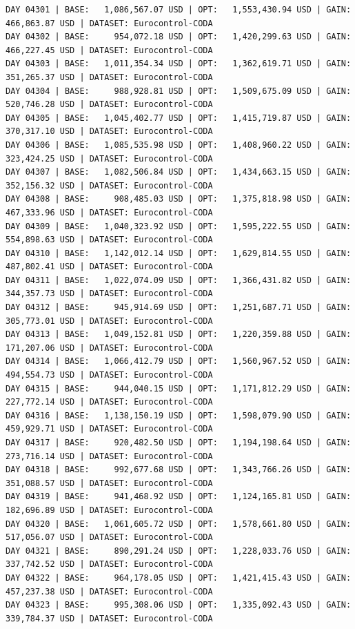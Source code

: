 \documentclass[11pt,a4paper]{article}
\begin{document}
\begin{verbatim}
DAY 04301 | BASE:   1,086,567.07 USD | OPT:   1,553,430.94 USD | GAIN: 466,863.87 USD | DATASET: Eurocontrol-CODA
DAY 04302 | BASE:     954,072.18 USD | OPT:   1,420,299.63 USD | GAIN: 466,227.45 USD | DATASET: Eurocontrol-CODA
DAY 04303 | BASE:   1,011,354.34 USD | OPT:   1,362,619.71 USD | GAIN: 351,265.37 USD | DATASET: Eurocontrol-CODA
DAY 04304 | BASE:     988,928.81 USD | OPT:   1,509,675.09 USD | GAIN: 520,746.28 USD | DATASET: Eurocontrol-CODA
DAY 04305 | BASE:   1,045,402.77 USD | OPT:   1,415,719.87 USD | GAIN: 370,317.10 USD | DATASET: Eurocontrol-CODA
DAY 04306 | BASE:   1,085,535.98 USD | OPT:   1,408,960.22 USD | GAIN: 323,424.25 USD | DATASET: Eurocontrol-CODA
DAY 04307 | BASE:   1,082,506.84 USD | OPT:   1,434,663.15 USD | GAIN: 352,156.32 USD | DATASET: Eurocontrol-CODA
DAY 04308 | BASE:     908,485.03 USD | OPT:   1,375,818.98 USD | GAIN: 467,333.96 USD | DATASET: Eurocontrol-CODA
DAY 04309 | BASE:   1,040,323.92 USD | OPT:   1,595,222.55 USD | GAIN: 554,898.63 USD | DATASET: Eurocontrol-CODA
DAY 04310 | BASE:   1,142,012.14 USD | OPT:   1,629,814.55 USD | GAIN: 487,802.41 USD | DATASET: Eurocontrol-CODA
DAY 04311 | BASE:   1,022,074.09 USD | OPT:   1,366,431.82 USD | GAIN: 344,357.73 USD | DATASET: Eurocontrol-CODA
DAY 04312 | BASE:     945,914.69 USD | OPT:   1,251,687.71 USD | GAIN: 305,773.01 USD | DATASET: Eurocontrol-CODA
DAY 04313 | BASE:   1,049,152.81 USD | OPT:   1,220,359.88 USD | GAIN: 171,207.06 USD | DATASET: Eurocontrol-CODA
DAY 04314 | BASE:   1,066,412.79 USD | OPT:   1,560,967.52 USD | GAIN: 494,554.73 USD | DATASET: Eurocontrol-CODA
DAY 04315 | BASE:     944,040.15 USD | OPT:   1,171,812.29 USD | GAIN: 227,772.14 USD | DATASET: Eurocontrol-CODA
DAY 04316 | BASE:   1,138,150.19 USD | OPT:   1,598,079.90 USD | GAIN: 459,929.71 USD | DATASET: Eurocontrol-CODA
DAY 04317 | BASE:     920,482.50 USD | OPT:   1,194,198.64 USD | GAIN: 273,716.14 USD | DATASET: Eurocontrol-CODA
DAY 04318 | BASE:     992,677.68 USD | OPT:   1,343,766.26 USD | GAIN: 351,088.57 USD | DATASET: Eurocontrol-CODA
DAY 04319 | BASE:     941,468.92 USD | OPT:   1,124,165.81 USD | GAIN: 182,696.89 USD | DATASET: Eurocontrol-CODA
DAY 04320 | BASE:   1,061,605.72 USD | OPT:   1,578,661.80 USD | GAIN: 517,056.07 USD | DATASET: Eurocontrol-CODA
DAY 04321 | BASE:     890,291.24 USD | OPT:   1,228,033.76 USD | GAIN: 337,742.52 USD | DATASET: Eurocontrol-CODA
DAY 04322 | BASE:     964,178.05 USD | OPT:   1,421,415.43 USD | GAIN: 457,237.38 USD | DATASET: Eurocontrol-CODA
DAY 04323 | BASE:     995,308.06 USD | OPT:   1,335,092.43 USD | GAIN: 339,784.37 USD | DATASET: Eurocontrol-CODA

\end{verbatim}
\end{document}
